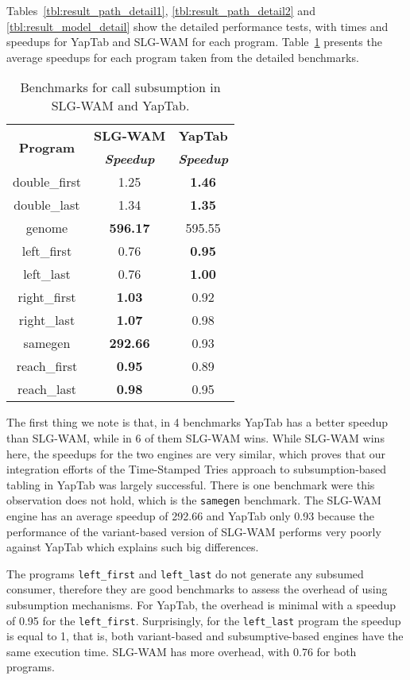 Tables~\ref{tbl:result_path_detail1}, \ref{tbl:result_path_detail2} and \ref{tbl:result_model_detail}
show the detailed performance tests, with times and speedups for YapTab and SLG-WAM for each program.
Table~\ref{tbl:results_overview} presents the average speedups for each program taken from the
detailed benchmarks.

\begin{table}[ht]
\centering
  \begin{tabular}{ccc}
   \hline
    \hline
    \multirow{2}{*}{\textbf{Program}} & \textbf{SLG-WAM} & \textbf{YapTab} \\
    & \textbf{\textit{\small{Speedup}}} & \textbf{\textit{\small{Speedup}}} \\
   \hline
   \hline
double\_first & 1.25 & \textbf{1.46} \\
double\_last & 1.34 & \textbf{1.35} \\
genome & \textbf{596.17} & 595.55 \\
left\_first & 0.76 & \textbf{0.95} \\
left\_last & 0.76  & \textbf{1.00} \\
right\_first & \textbf{1.03} & 0.92 \\
right\_last & \textbf{1.07} & 0.98 \\
samegen & \textbf{292.66} & 0.93 \\
reach\_first  & \textbf{0.95} & 0.89 \\
reach\_last  & \textbf{0.98} & 0.95 \\
\hline
\hline
\end{tabular}
\caption{Benchmarks for call subsumption in SLG-WAM and YapTab.}
\label{tbl:results_overview}
\end{table}

The first thing we note is that, in 4 benchmarks
YapTab has a better speedup than SLG-WAM, while in 6 of them SLG-WAM wins. While SLG-WAM wins here,
the speedups for the two engines are very similar, which proves that our integration
efforts of the Time-Stamped Tries approach to subsumption-based tabling in YapTab was largely successful.
There is one benchmark were this observation does not hold, which is the \texttt{samegen} benchmark.
The SLG-WAM engine has an average speedup of 292.66 and YapTab only 0.93 because the performance
of the variant-based version of SLG-WAM performs very poorly against YapTab which explains such big differences.

The programs \texttt{left\_first} and \texttt{left\_last} do not generate any subsumed consumer,
therefore they are good benchmarks to assess the overhead of using subsumption mechanisms. For YapTab,
the overhead is minimal with a speedup of 0.95 for the \texttt{left\_first}. Surprisingly, for the
\texttt{left\_last} program the speedup is equal to 1, that is, both variant-based and subsumptive-based
engines have the same execution time. SLG-WAM has more overhead, with 0.76 for both programs.

